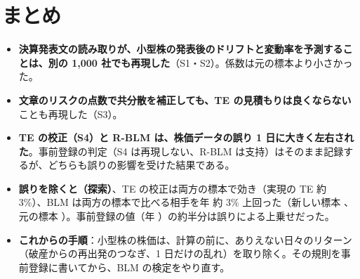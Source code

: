 \chapter{まとめ}\label{ch:summary}

\begin{itemize}
\item \textbf{決算発表文の読み取りが、小型株の発表後のドリフトと変動率を予測することは、別の 1,000 社でも再現した}（S1・S2）。係数は元の標本より小さかった。
\item \textbf{文章のリスクの点数で共分散を補正しても、TE の見積もりは良くならない}ことも再現した（S3）。
\item \textbf{TE の校正（S4）と R-BLM は、株価データの誤り 1 日に大きく左右された}。事前登録の判定（S4 は再現しない、R-BLM は支持）はそのまま記録するが、どちらも誤りの影響を受けた結果である。
\item \textbf{誤りを除くと（探索）}、TE の校正は両方の標本で効き（実現の TE 約 3\%）、BLM は両方の標本で比べる相手を年 約 3\% 上回った（新しい標本 、元の標本 ）。事前登録の値（年 ）の約半分は誤りによる上乗せだった。
\item \textbf{これからの手順}：小型株の株価は、計算の前に、ありえない日々のリターン（破産からの再出発のつなぎ、1 日だけの乱れ）を取り除く。その規則を事前登録に書いてから、BLM の検定をやり直す。
\end{itemize}
